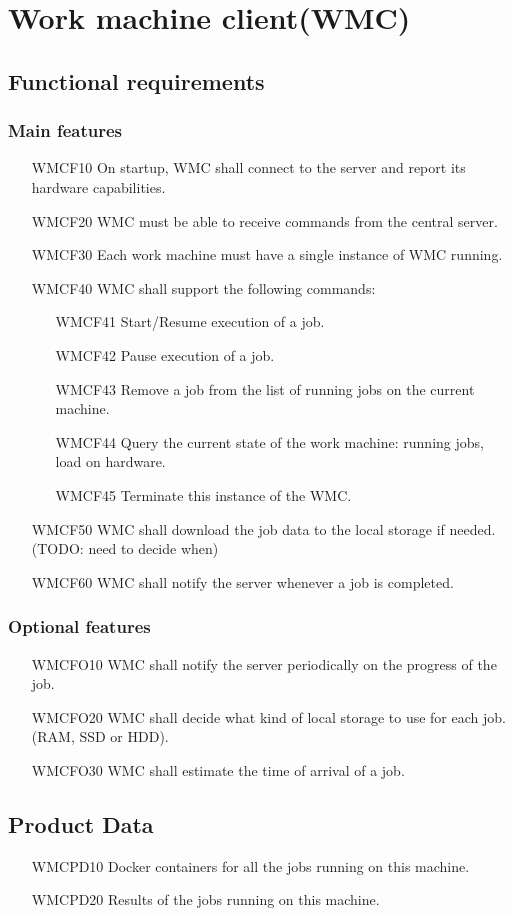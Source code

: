 \section{Work machine client(WMC)}
  \subsection{Functional requirements}
    \subsubsection{Main features}
    \begin{enumerate}
      \item[WMCF10] On startup, WMC shall connect to the server and report its hardware capabilities.
      \item[WMCF20] WMC must be able to receive commands from the central server.
      \item[WMCF30] Each work machine must have a single instance of WMC running.
      \item[WMCF40] WMC shall support the following commands:
      \begin{enumerate}
        \item[WMCF41] Start/Resume execution of a job.
        \item[WMCF42] Pause execution of a job.
        \item[WMCF43] Remove a job from the list of running jobs on the current machine.
        \item[WMCF44] Query the current state of the work machine: running jobs, load on hardware.
        \item[WMCF45] Terminate this instance of the WMC.
      \end{enumerate}
      \item[WMCF50] WMC shall download the job data to the local storage if needed. (TODO: need to decide when)
      \item[WMCF60] WMC shall notify the server whenever a job is completed.
    \end{enumerate}

    \subsubsection{Optional features}
      \begin{enumerate}
        \item[WMCFO10] WMC shall notify the server periodically on the progress of the job.
        \item[WMCFO20] WMC shall decide what kind of local storage to use for each job. (RAM, SSD or HDD).
        \item[WMCFO30] WMC shall estimate the time of arrival of a job.
      \end{enumerate}

  \subsection{Product Data}
  \begin{enumerate}
    \item[WMCPD10] Docker containers for all the jobs running on this machine.
    \item[WMCPD20] Results of the jobs running on this machine.
  \end{enumerate}
